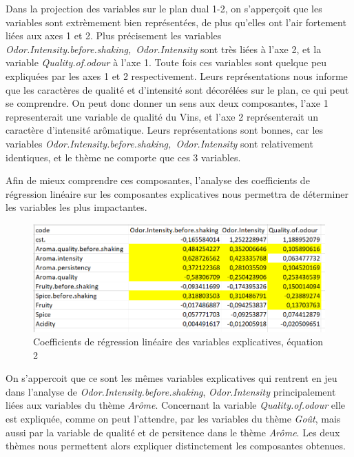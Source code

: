 \documentclass[a4paper,french,10pt]{article}
\begin{document}
Dans la projection des variables sur le plan dual 1-2, on s'apperçoit que les variables sont extrèmement bien représentées, de plus qu'elles ont l'air fortement liées aux axes 1 et 2. Plus précisement les variables \textit{Odor.Intensity.before.shaking,~Odor.Intensity} sont très liées à l'axe 2, et la variable \textit{Quality.of.odour} à l'axe 1. Toute fois ces variables sont quelque peu expliquées par les axes 1 et 2 respectivement. 
Leurs représentations nous informe que les caractères de qualité et d'intensité sont décorélées sur le plan, ce qui peut se comprendre.
On peut donc donner un sens aux deux composantes, l'axe 1 representerait une variable de qualité du Vins, et l'axe 2 représenterait un caractère d'intensité arômatique. \newline
Leurs représentations sont bonnes, car les variables \textit{Odor.Intensity.before.shaking,~Odor.Intensity} sont relativement identiques, et le thème ne comporte que ces 3 variables.

Afin de mieux comprendre ces composantes, l'analyse des coefficients de régression linéaire sur les composantes explicatives nous permettra de déterminer les variables les plus impactantes. \newline

\begin{figure}[htp] 
	\centering
	\includegraphics[scale=0.45]{images/Coeff_var_Eq2.png}
	\caption{Coefficients de régression linéaire des variables explicatives, équation 2}
\end{figure}


On s'appercoit que ce sont les mêmes variables explicatives qui rentrent en jeu dans l'analyse de \textit{Odor.Intensity.before.shaking}, \textit{Odor.Intensity} principalement liées aux variables du thème \textit{Arôme}. Concernant la variable \textit{Quality.of.odour} elle est expliquée, comme on peut l'attendre, par les variables du thème \textit{Goût}, mais aussi par la variable de qualité et de persitence dans le thème \textit{Arôme}. Les deux thèmes nous permettent alors expliquer distinctement les composantes obtenues. \newline
\end{document}
